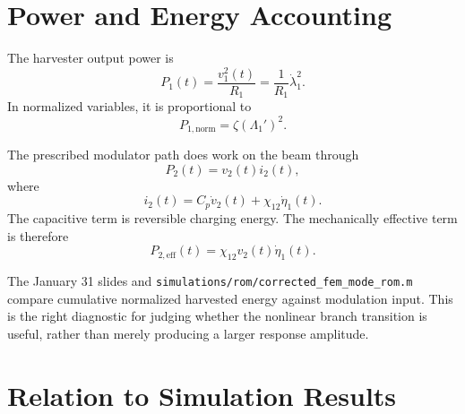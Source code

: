 \documentclass[11pt]{article}
\begin{document}
\section{Power and Energy Accounting}

The harvester output power is
\begin{equation}
  P_1(t)=\frac{v_1^2(t)}{R_1}
  =
  \frac{1}{R_1}\dot\lambda_1^2.
\end{equation}
In normalized variables, it is proportional to
\begin{equation}
  P_{1,\mathrm{norm}}=\zeta\left(\Lambda_1'\right)^2.
\end{equation}

The prescribed modulator path does work on the beam through
\begin{equation}
  P_2(t)=v_2(t)i_2(t),
\end{equation}
where
\begin{equation}
  i_2(t)=C_p\dot v_2(t)+\chi_{12}\dot\eta_1(t).
\end{equation}
The capacitive term is reversible charging energy.  The mechanically effective
term is therefore
\begin{equation}
  P_{2,\mathrm{eff}}(t)=\chi_{12}v_2(t)\dot\eta_1(t).
\end{equation}

The January 31 slides and \texttt{simulations/rom/corrected\_fem\_mode\_rom.m}
compare cumulative normalized harvested energy against modulation input.  This
is the right diagnostic for judging whether the nonlinear branch transition is
useful, rather than merely producing a larger response amplitude.

\section{Relation to Simulation Results}
\end{document}
